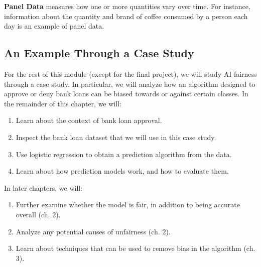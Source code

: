 \par \textbf{Panel Data} measures how one or more quantities vary over time. For instance, information about the quantity and brand of coffee consumed by a person each day is an example of panel data.




\subsection{An Example Through a Case Study}
\par For the rest of this module (except for the final project), we will study AI fairness through a case study. In particular, we will analyze how an algorithm designed to approve or deny bank loans can be biased towards or against certain classes. In the remainder of this chapter, we will:
\begin{enumerate}
    \item Learn about the context of bank loan approval.
    \item Inspect the bank loan dataset that we will use in this case study.
    \item Use logistic regression to obtain a prediction algorithm from the data.
    \item Learn about how prediction models work, and how to evaluate them.
\end{enumerate}

\par In later chapters, we will:
\begin{enumerate}
    \item Further examine whether the model is fair, in addition to being accurate overall (ch. 2).
    \item Analyze any potential causes of unfairness (ch. 2).
    \item Learn about techniques that can be used to remove bias in the algorithm (ch. 3).
\end{enumerate}


